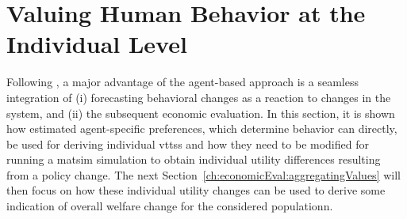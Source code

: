 %
%
%
%
%

\section{Valuing Human Behavior at the Individual Level}
\label{ch:economicEval:valuingBehavior}
Following \citet{deJongEtAl2007LogsumTRA}, a major advantage of the agent-based approach is a seamless integration of (i) forecasting behavioral changes as a reaction to changes in the system, and (ii) the subsequent economic evaluation.
%
In this section, it is shown how estimated agent-specific preferences, which determine behavior can directly, be used for deriving individual \glspl{vtts} and how they need to be modified for running a \gls{matsim} simulation to obtain individual utility differences resulting from a policy change.
%
The next Section~\ref{ch:economicEval:aggregatingValues} will then focus on how these individual utility changes can be used to derive some indication of overall welfare change for the considered populationn.

